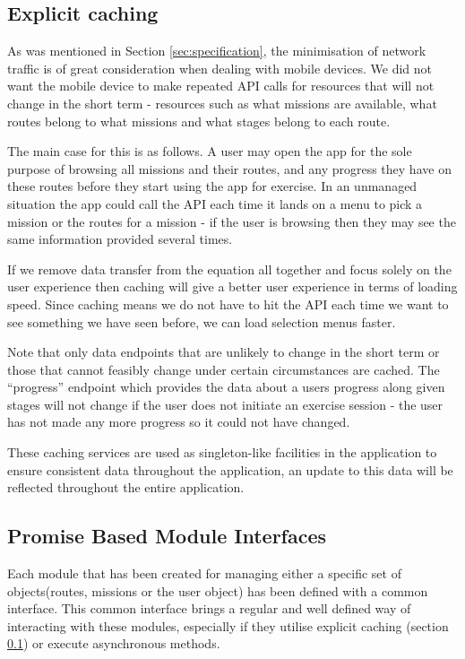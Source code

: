 \subsection{Explicit caching}
\label{sec:explicit_caching}
As was mentioned in Section \ref{sec:specification}, the minimisation of network
traffic is of great consideration when dealing with mobile devices. We
did not want the mobile device to make repeated API calls for
resources that will not change in the short term - resources such as
what missions are available, what routes belong to what missions and
what stages belong to each route. 

The main case for this is as follows. A user may open the app for the
sole purpose of browsing all missions and their routes, and any
progress they have on these routes before they start using the app for
exercise. In an unmanaged situation the app could call the API each
time it lands on a menu to pick a mission or the routes for a mission
- if the user is browsing then they may see the same information
provided several times. 

If we remove data transfer from the equation all together and focus
solely on the user experience then caching will give a better user
experience in terms of loading speed. Since caching means we do not
have to hit the API each time we want to see something we have seen
before, we can load selection menus faster. 

Note that only data endpoints that are unlikely to change in the short
term or those that cannot feasibly change under certain circumstances
are cached. The ``progress'' endpoint which provides the data about a
users progress along given stages will not change if the user does not
initiate an exercise session - the user has not made any more progress
so it could not have changed.

These caching services are used as singleton-like facilities in the
application to ensure consistent data throughout the application, an
update to this data will be reflected throughout the entire
application. 

\subsection{Promise Based Module Interfaces}
Each module that has been created for managing either a specific set
of objects(routes, missions or the user object) has been defined
with a common interface. This common interface brings a regular
and well defined way of interacting with these modules, especially if
they utilise explicit caching (section \ref{sec:explicit_caching}) or
execute asynchronous methods.

